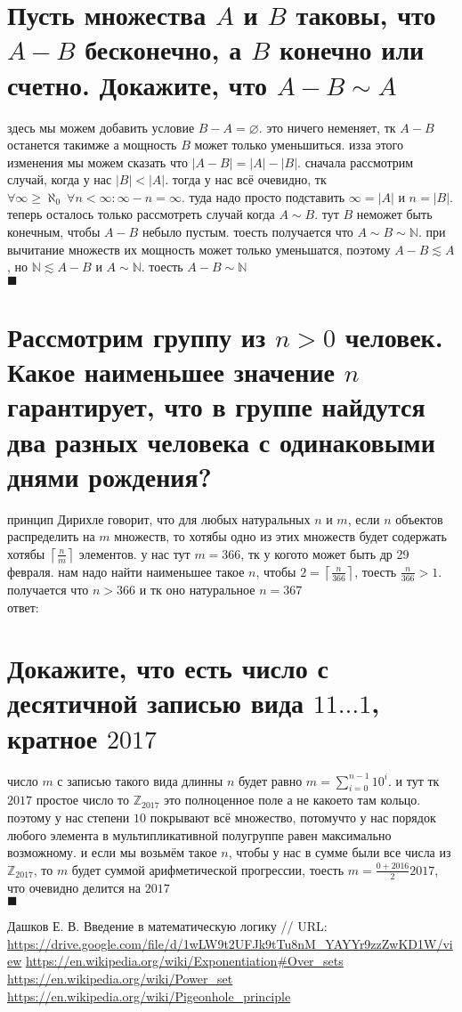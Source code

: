 \documentclass{article}
\newcommand{\ds}{\displaystyle}
\newcommand{\N}{\mathbb{N}}
\newcommand{\Z}{\mathbb{Z}}
\renewcommand{\f}{\frac}
\renewcommand{\l}{\left}
\renewcommand{\r}{\right}
\renewcommand{\emptyset}{\varnothing}
\begin{document}
  \section{Пусть множества $A$ и $B$ таковы, что $A - B$ бесконечно, а $B$ конечно или счетно. Докажите, что $A - B \sim A$}
  здесь мы можем добавить условие $B - A = \emptyset$. это ничего неменяет, тк $A - B$ останется такимже а мощность $B$ может только уменьшиться.
  изза этого изменения мы можем сказать что $|A-B| = |A|-|B|$.
  сначала рассмотрим случай, когда у нас $|B| < |A|$.
  тогда у нас всё очевидно, тк $\forall \infty \geq \aleph_0\ \forall n < \infty: \infty-n=\infty$.
  туда надо просто подставить $\infty=|A|$ и $n=|B|$.
  теперь осталось только рассмотреть случай когда $A \sim B$.
  тут $B$ неможет быть конечным, чтобы $A-B$ небыло пустым.
  тоесть получается что $A \sim B \sim \N$.
  при вычитание множеств их мощность может только уменьшатся, поэтому $A-B \lesssim A$,
  но $\N \lesssim A-B$ и $A \sim \N$. тоесть $A-B \sim \N$ \\
  $\blacksquare$

  \section{Рассмотрим группу из $n > 0$ человек. Какое наименьшее значение $n$ гарантирует, что в группе найдутся два разных человека с одинаковыми днями рождения?}
  принцип Дирихле говорит, что для любых натуральных $n$ и $m$, если $n$ объектов распределить на $m$ множеств, то
  хотябы одно из этих множеств будет содержать хотябы $\ds\l\lceil\f{n}{m}\r\rceil$ элементов.
  у нас тут $m=366$, тк у когото может быть др 29 февраля.
  нам надо найти наименьшее такое $n$, чтобы $\ds 2=\l\lceil\f{n}{366}\r\rceil $, тоесть $\ds \f{n}{366} > 1$.
  получается что $n > 366$ и тк оно натуральное $n=367$ \\
  ответ: 

  \section{Докажите, что есть число с десятичной записью вида $11\dots1$, кратное $2017$}
  число $m$ с записью такого вида длинны $n$ будет равно $\ds m=\sum_{i=0}^{n-1} 10^i $.
  и тут тк $2017$ простое число то $\Z_{2017}$ это полноценное поле а не какоето там кольцо.
  поэтому у нас степени $10$ покрывают всё множество,
  потомучто у нас порядок любого элемента в мультипликативной полугруппе равен максимально возможному.
  и если мы возьмём такое $n$, чтобы у нас в сумме были все числа из $\Z_{2017}$, то
  $m$ будет суммой арифметической прогрессии, тоесть $\ds m=\f{0+2016}{2}2017 $, что очевидно делится на $2017$ \\
  $\blacksquare$

  \vfill
  \begin{thebibliography}{9}
     Дашков Е. В. Введение в математическую логику // URL: \url{https://drive.google.com/file/d/1wLW9t2UFJk9tTu8nM_YAYYr9zzZwKD1W/view}
     \url{https://en.wikipedia.org/wiki/Exponentiation#Over_sets}
     \url{https://en.wikipedia.org/wiki/Power_set}
     \url{https://en.wikipedia.org/wiki/Pigeonhole_principle}
  \end{thebibliography}
\end{document}
